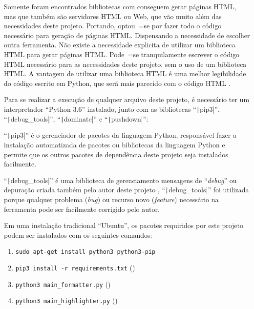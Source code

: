 Somente foram encontrados bibliotecas com  conseguem gerar páginas HTML,
mas que também são servidores HTML ou
Web,
que vão muito além das necessidades deste projeto.
Portando,
optou~=se por fazer todo o código necessário para geração de páginas HTML.
Dispensando a necessidade de escolher outra ferramenta.
Não existe a necessidade explicita de utilizar um biblioteca HTML para gerar páginas HTML.
Pode~=se tranquilamente escrever o código HTML necessário para as necessidades deste projeto,
sem o uso de um biblioteca HTML.
A vantagem de utilizar uma biblioteca HTML é uma melhor legibilidade do código escrito em Python,
que será mais parecido com o código HTML \cite{webDevelopmentWithDjango}.

Para se realizar a execução de qualquer arquivo deste projeto,
é necessário ter um interpretador ``Python 3.6'' instalado,
junto com as bibliotecas ``\texttt|pip3|'',
``\texttt|debug_tools|'', ``\texttt|dominate|'' e
``\texttt|pushdown|'':
\begin{inparaenum}[1)]
\item ``\texttt|pip3|'' é o gerenciador de pacotes da linguagem Python,
responsável fazer a instalação automatizada de pacotes ou
bibliotecas da linguagem Python e
permite que os outros pacotes de dependência deste projeto seja instalados facilmente.
\item ``\texttt|debug_tools|'' é uma biblioteca de gerenciamento mensagens de ``\textit{debug}'' ou
depuração \cite{debuggingIntoExamples,annotationAssistant} criada também pelo autor deste projeto \cite{debugToolsLogger},
``\texttt|debug_tools|'' foi utilizada porque qualquer problema (\textit{bug}) ou
recurso novo (\textit{feature}) necessário na ferramenta pode ser facilmente corrigido pelo autor.
\end{inparaenum}%
Em uma instalação tradicional ``Ubuntu'',
os pacotes requiridos por este projeto podem ser instalados com os seguintes comandos:
\begin{enumerate}[1)]
\item \texttt{sudo apt-get install python3 python3-pip}
\item \texttt{pip3 install -r requirements.txt} ()
\item \texttt{python3 main_formatter.py} ()
\item \texttt{python3 main_highlighter.py} ()
\end{enumerate}

